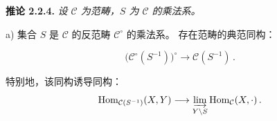 \smallskip
\noindent\textbf{推论 2.2.4.}\quad
\begingroup\itshape
设 $\mathcal C$ 为范畴，$S$ 为 $\mathcal C$ 的乘法系。

\par\noindent a) 集合 $S$ 是 $\mathcal C$ 的反范畴
$\mathcal C^\circ$ 的乘法系。
%
存在范畴的典范同构：

\[
  \bigl(\mathcal C^\circ(S^{-1})\bigr)^\circ
  \longrightarrow \mathcal C(S^{-1})\,.
\]

\noindent 特别地，该同构诱导同构：
\[
  \operatorname{Hom}_{\mathcal C(S^{-1})}(X,Y)
  \longrightarrow
  \varinjlim_{Y\backslash S}\operatorname{Hom}_{\mathcal C}(X,\mathord\cdot)\,.
\]
\endgroup

\endgroup
